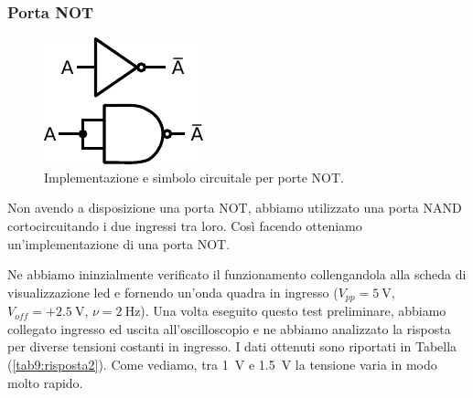 \subsubsection{Porta NOT}


\begin{figure}
\centering
\includegraphics[width=.16\textwidth]{../E09/latex/NOT.pdf}
\caption{Implementazione e simbolo circuitale per porte NOT.}
\label{cir9:not}
\end{figure}

Non avendo a disposizione una porta NOT, abbiamo utilizzato una porta NAND cortocircuitando i due ingressi tra loro.
Così facendo otteniamo un'implementazione di una porta NOT.

Ne abbiamo ininzialmente verificato il funzionamento collengandola alla scheda di visualizzazione led e fornendo un'onda quadra in ingresso ($V_{pp}=\SI{5}{\volt}$, $V_{off}=+\SI{2.5}{\volt}$, $\nu=\SI{2}{\hertz}$).
Una volta eseguito questo test preliminare, abbiamo collegato ingresso ed uscita all'oscilloscopio e ne abbiamo analizzato la risposta per diverse tensioni costanti in ingresso.
I dati ottenuti sono riportati in Tabella (\ref{tab9:risposta2}).
Come vediamo, tra \SI{1}{\volt} e \SI{1.5}{\volt} la tensione varia in modo molto rapido.


